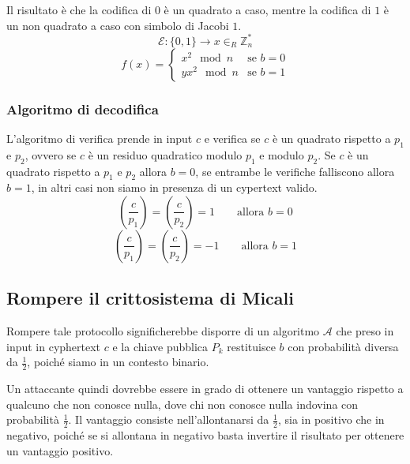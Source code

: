 Il risultato è che la codifica di $0$ è un quadrato a caso, mentre la codifica di $1$ è
un non quadrato a caso con simbolo di Jacobi $1$.
\[
  \mathcal{E}: \{0, 1\} \to x \in_R \mathbb{Z}_n^*
\]
\[
  f(x) = \begin{cases}
    x^2 \mod n & \text{se } b = 0\\
    yx^2 \mod n & \text{se } b = 1
  \end{cases}
\]
\subsubsection{Algoritmo di decodifica}
L'algoritmo di verifica prende in input $c$ e verifica se $c$ è un quadrato 
rispetto a $p_1$ e $p_2$, ovvero se $c$ è un residuo quadratico modulo $p_1$ e
modulo $p_2$. Se $c$ è un quadrato rispetto a $p_1$ e $p_2$ allora $b = 0$,
se entrambe le verifiche falliscono allora $b = 1$, in altri casi non siamo in presenza 
di un cypertext valido.
\[
  \left(\frac{c}{p_1}\right) = \left(\frac{c}{p_2}\right) = 1 \qquad \text{allora } b = 0
\]
\[
  \left(\frac{c}{p_1}\right) = \left(\frac{c}{p_2}\right) = -1 \qquad \text{allora } b = 1
\]
\subsection{Rompere il crittosistema di Micali}
Rompere tale protocollo significherebbe disporre di un algoritmo $\mathcal{A}$ che preso in 
input in cyphertext $c$ e la chiave pubblica $P_k$ restituisce $b$ con probabilità
diversa da $\frac{1}{2}$, poiché siamo in un contesto binario.

Un attaccante quindi dovrebbe essere in grado di ottenere un vantaggio rispetto 
a qualcuno che non conosce nulla, dove chi non conosce 
nulla indovina con probabilità $\frac{1}{2}$.
Il vantaggio consiste nell'allontanarsi da $\frac{1}{2}$, sia in positivo che in negativo, 
poiché se si allontana in negativo basta invertire il risultato per ottenere
un vantaggio positivo.

